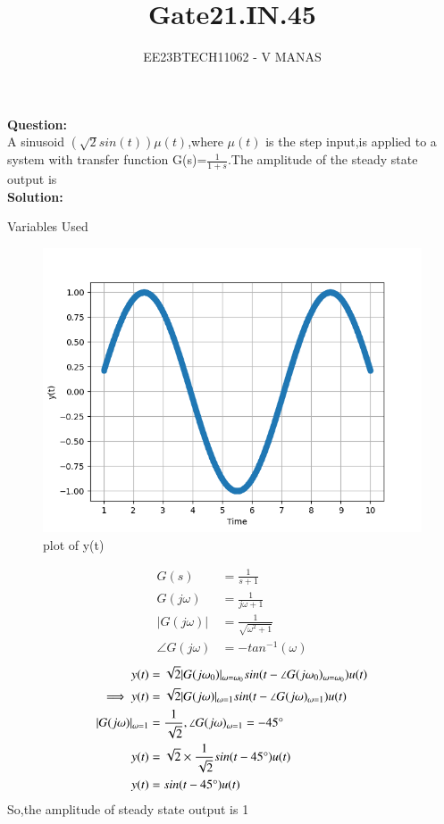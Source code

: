 \documentclass[journal,12pt,twocolumn]{IEEEtran}
\theoremstyle{remark}
\begin{document}

\vspace{3cm}

\title{Gate21.IN.45}
\author{EE23BTECH11062 - V MANAS}
\maketitle
\newpage

\bigskip
\textbf{Question:}\\A sinusoid $(\sqrt{2}sin(t))\mu(t)$,where $\mu(t)$ is the step input,is applied to a system with transfer function G(s)=$\frac{1}{1+s}$.The amplitude of the steady state output is\\
\textbf{Solution:}
\begin{table}[h]
    \centering
    
    \caption{Variables Used}
    \label{tab:gate21.in.45}
\end{table}
\begin{figure}[h]
    \centering
    \includegraphics[width=1.0\linewidth]{figs/graph.png}
    \caption{plot of y(t)}
\end{figure}
\begin{align}
    G(s)&=\frac{1}{s+1}\\
    G(j\omega)&=\frac{1}{j\omega+1}\\
    |G(j\omega)|&=\frac{1}{\sqrt{\omega^2+1}}\\
    \angle G(j\omega)&=-tan^{-1}(\omega)
\end{align}
\begin{align}
    y(t)&=\sqrt{2}|G(j\omega_0)|_{\omega=\omega_0}sin(t-\angle G(j\omega_0)_{\omega=\omega_0})u(t)\\    
    \implies y(t)&=\sqrt{2}|G(j\omega)|_{\omega=1}sin(t-\angle G(j\omega)_{\omega=1})u(t)\\
    |G(j\omega)|_{\omega=1}&=\frac{1}{\sqrt{2}},\angle G(j\omega)_{\omega=1}=-45\degree\\
    y(t)&=\sqrt{2}\times\frac{1}{\sqrt{2}}sin(t-45\degree)u(t)\\
    y(t)&=sin(t-45\degree)u(t)
\end{align}
So,the amplitude of steady state output is 1
\end{document}
